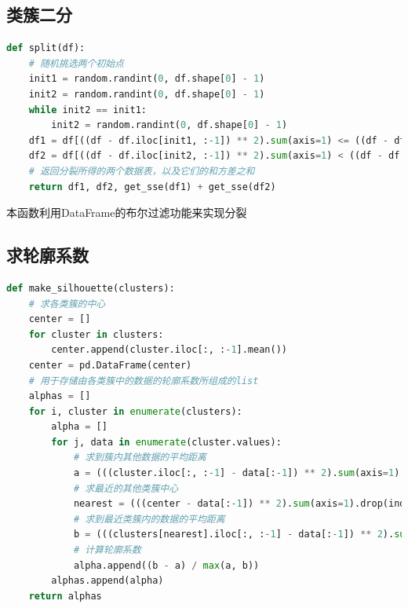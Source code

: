 \documentclass[a4paper,11pt]{article}%
\theoremstyle{remark}
\theoremstyle{remark}
\theoremstyle{definition}
\theoremstyle{definition}
\theoremstyle{definition}
\begin{document}
\subsection{类簇二分}
\begin{lstlisting}[language={Python},keywordstyle=\color{blue!70},commentstyle=\color{red!50!green!50!blue!50},frame=shadowbox,
    rulesepcolor=\color{red!20!green!20!blue!20}]
def split(df):
    # 随机挑选两个初始点
    init1 = random.randint(0, df.shape[0] - 1)
    init2 = random.randint(0, df.shape[0] - 1)
    while init2 == init1:
        init2 = random.randint(0, df.shape[0] - 1)
    df1 = df[((df - df.iloc[init1, :-1]) ** 2).sum(axis=1) <= ((df - df.iloc[init2, :-1]) ** 2).sum(axis=1)]
    df2 = df[((df - df.iloc[init2, :-1]) ** 2).sum(axis=1) < ((df - df.iloc[init1, :-1]) ** 2).sum(axis=1)]
    # 返回分裂所得的两个数据表，以及它们的和方差之和
    return df1, df2, get_sse(df1) + get_sse(df2)
\end{lstlisting}
本函数利用DataFrame的布尔过滤功能来实现分裂
\subsection{求轮廓系数}
\begin{lstlisting}[language={Python},keywordstyle=\color{blue!70},commentstyle=\color{red!50!green!50!blue!50},frame=shadowbox,
    rulesepcolor=\color{red!20!green!20!blue!20}]
def make_silhouette(clusters):
    # 求各类簇的中心
    center = []
    for cluster in clusters:
        center.append(cluster.iloc[:, :-1].mean())
    center = pd.DataFrame(center)
    # 用于存储由各类簇中的数据的轮廓系数所组成的list
    alphas = []
    for i, cluster in enumerate(clusters):
        alpha = []
        for j, data in enumerate(cluster.values):
            # 求到簇内其他数据的平均距离
            a = (((cluster.iloc[:, :-1] - data[:-1]) ** 2).sum(axis=1) ** 0.5).mean(axis=0)
            # 求最近的其他类簇中心
            nearest = (((center - data[:-1]) ** 2).sum(axis=1).drop(index=i) ** 0.5).idxmin()
            # 求到最近类簇内的数据的平均距离
            b = (((clusters[nearest].iloc[:, :-1] - data[:-1]) ** 2).sum(axis=1) ** 0.5).mean(axis=0)
            # 计算轮廓系数
            alpha.append((b - a) / max(a, b))
        alphas.append(alpha)
    return alphas
\end{lstlisting}
\end{document}
